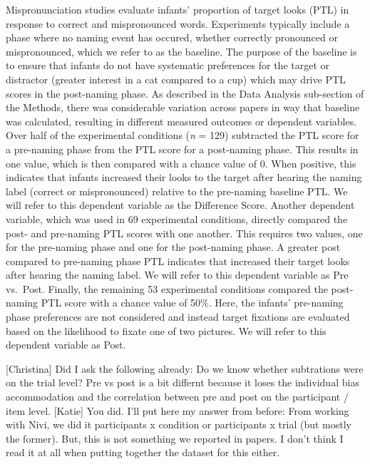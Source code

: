 \documentclass[man]{apa6}
\theoremstyle{definition}
\theoremstyle{definition}
\theoremstyle{definition}
\theoremstyle{remark}
\begin{document}
Mispronunciation studies evaluate infants' proportion of target looks
(PTL) in response to correct and mispronounced words. Experiments
typically include a phase where no naming event has occured, whether
correctly pronounced or mispronounced, which we refer to as the
baseline. The purpose of the baseline is to ensure that infants do not
have systematic preferences for the target or distractor (greater
interest in a cat compared to a cup) which may drive PTL scores in the
post-naming phase. As described in the Data Analysis sub-section of the
Methods, there was considerable variation across papers in way that
baseline was calculated, resulting in different measured outcomes or
dependent variables. Over half of the experimental conditions (\emph{n}
= 129) subtracted the PTL score for a pre-naming phase from the PTL
score for a post-naming phase. This results in one value, which is then
compared with a chance value of 0. When positive, this indicates that
infants increased their looks to the target after hearing the naming
label (correct or mispronounced) relative to the pre-naming baseline
PTL. We will refer to this dependent variable as the Difference Score.
Another dependent variable, which was used in 69 experimental
conditions, directly compared the post- and pre-naming PTL scores with
one another. This requires two values, one for the pre-naming phase and
one for the post-naming phase. A greater post compared to pre-naming
phase PTL indicates that increased their target looks after hearing the
naming label. We will refer to this dependent variable as Pre vs.~Post.
Finally, the remaining 53 experimental conditions compared the
post-naming PTL score with a chance value of 50\%. Here, the infants'
pre-naming phase preferences are not considered and instead target
fixations are evaluated based on the likelihood to fixate one of two
pictures. We will refer to this dependent variable as Post.

{[}Christina{]} Did I ask the following already: Do we know whether
subtrations were on the trial level? Pre vs post is a bit differnt
because it loses the individual bias accommodation and the correlation
between pre and post on the participant / item level. {[}Katie{]} You
did. I'll put here my answer from before: From working with Nivi, we did
it participants x condition or participants x trial (but mostly the
former). But, this is not something we reported in papers. I don't think
I read it at all when putting together the dataset for this either.
\end{document}
